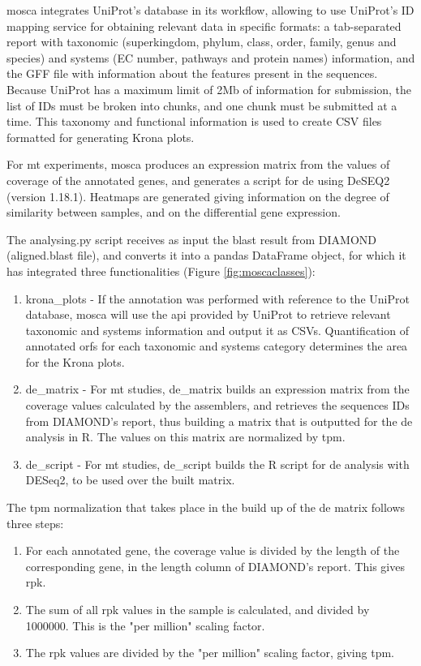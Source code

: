 \documentclass[
  oneside,
  11pt, a4paper,
  footinclude=true,
  headinclude=true,
  cleardoublepage=empty
]{scrbook}
\begin{document}
    \gls{mosca} integrates UniProt's database in its workflow, allowing to use UniProt's ID mapping service for obtaining relevant data in specific formats: a tab-separated report with taxonomic (superkingdom, phylum, class, order, family, genus and species) and systems (EC number,  pathways and protein names) information, and the GFF file with information about the features present in the sequences. Because UniProt has a maximum limit of 2Mb of information for submission, the list of IDs must be broken into chunks, and one chunk must be submitted at a time. This taxonomy and functional information is used to create CSV files formatted for generating Krona plots.
    
    For \gls{mt} experiments, \gls{mosca} produces an expression matrix from the values of coverage of the annotated genes, and generates a script for \gls{de} using DeSEQ2 (version 1.18.1). Heatmaps are generated giving information on the degree of similarity between samples, and on the differential gene expression.
    
    The analysing.py script receives as input the blast result from DIAMOND (aligned.blast file), and converts it into a pandas DataFrame object, for which it has integrated three functionalities (Figure \ref{fig:moscaclasses}): 
    \begin{enumerate}
        \item krona\_plots - If the annotation was performed with reference to the UniProt database, \gls{mosca} will use the \gls{api} provided by UniProt to retrieve relevant taxonomic and systems information and output it as CSVs. Quantification of annotated \gls{orf}s for each taxonomic and systems category determines the area for the Krona plots.
        \item de\_matrix - For \gls{mt} studies, de\_matrix builds an expression matrix from the coverage values calculated by the assemblers, and retrieves the sequences IDs from DIAMOND's report, thus building a matrix that is outputted for the \gls{de} analysis in R. The values on this matrix are normalized by \gls{tpm}.
        \item de\_script - For \gls{mt} studies, de\_script builds the R script for \gls{de} analysis with DESeq2, to be used over the built matrix.
    \end{enumerate}
    
    The \gls{tpm} normalization that takes place in the build up of the \gls{de} matrix follows three steps:
    \begin{enumerate}
        \item For each annotated gene, the coverage value is divided by the length of the corresponding gene, in the length column of DIAMOND's report. This gives \gls{rpk}.
        \item The sum of all \gls{rpk} values in the sample is calculated, and divided by 1000000. This is the "per million" scaling factor.
        \item The \gls{rpk} values are divided by the "per million" scaling factor, giving \gls{tpm}.
    \end{enumerate}
    
\end{document}
